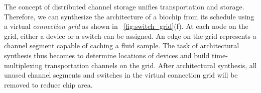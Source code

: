 The concept of 
distributed channel storage
unifies transportation and storage.
Therefore, we can
synthesize the architecture of a biochip from its schedule using
a virtual \textit{connection grid} as shown in \figname~\ref{fig:switch_grid}(f). 
At each node on the grid, 
either a device or a switch can be assigned. An edge on the grid represents
a channel segment capable of caching a fluid sample.
%
%
The task of architectural synthesis thus becomes to determine locations of
devices and build time-multiplexing transportation channels on the grid.
After architectural synthesis, all unused channel segments and switches in the virtual
connection grid will be removed to reduce chip area.


